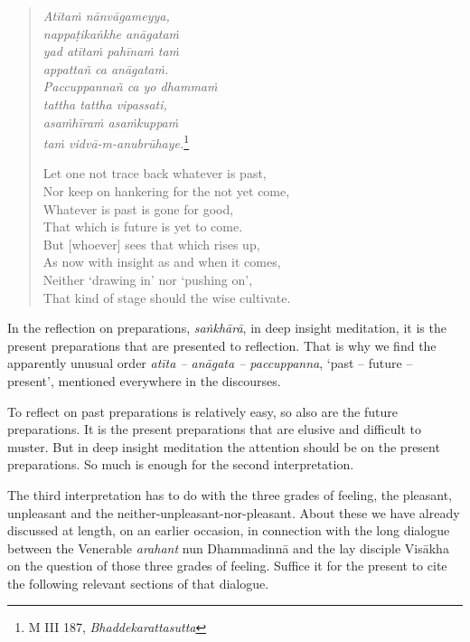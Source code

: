 \begin{quote}
\emph{Atītaṁ nānvāgameyya,}\\
\emph{nappaṭikaṅkhe anāgataṁ}\\
\emph{yad atītaṁ pahīnaṁ taṁ}\\
\emph{appattañ ca anāgataṁ.}\\
\emph{Paccuppannañ ca yo dhammaṁ}\\
\emph{tattha tattha vipassati,}\\
\emph{asaṁhīraṁ asaṁkuppaṁ}\\
\emph{taṁ vidvā-m-anubrūhaye.}\footnote{M III 187, \emph{Bhaddekarattasutta}}

Let one not trace back whatever is past,\\
Nor keep on hankering for the not yet come,\\
Whatever is past is gone for good,\\
That which is future is yet to come.\\
But {[}whoever{]} sees that which rises up,\\
As now with insight as and when it comes,\\
Neither `drawing in' nor `pushing on',\\
That kind of stage should the wise cultivate.
\end{quote}

In the reflection on preparations, \emph{saṅkhārā}, in deep insight meditation, it is the present preparations that are presented to reflection. That is why we find the apparently unusual order \emph{atīta -- anāgata -- paccuppanna}, `past -- future -- present', mentioned everywhere in the discourses.

To reflect on past preparations is relatively easy, so also are the future preparations. It is the present preparations that are elusive and difficult to muster. But in deep insight meditation the attention should be on the present preparations. So much is enough for the second interpretation.

The third interpretation has to do with the three grades of feeling, the pleasant, unpleasant and the neither-unpleasant-nor-pleasant. About these we have already discussed at length, on an earlier occasion, in connection with the long dialogue between the Venerable \emph{arahant} nun Dhammadinnā and the lay disciple Visākha on the question of those three grades of feeling. Suffice it for the present to cite the following relevant sections of that dialogue.

